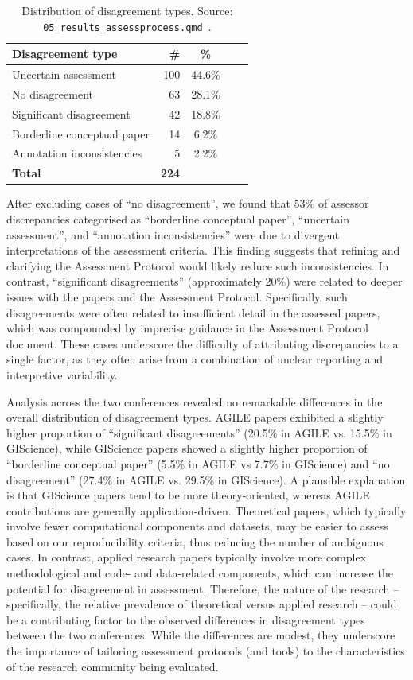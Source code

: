 \documentclass{josis}
\begin{document}
\begin{table}
\centering
\begin{tabular}{lrcrr}
\hline
Disagreement type & \# & \% \\
\hline
Uncertain assessment & 100 & 44.6\% \\
No disagreement & 63 & 28.1\% \\ 
Significant disagreement & 42 &  18.8\% \\ 
Borderline conceptual paper & 14 & 6.2\% \\ 
Annotation inconsistencies & 5 & 2.2\% \\ 
\textbf{Total} &  \textbf{224} & \\
\hline

\end{tabular}
\caption{Distribution of disagreement types. Source: \texttt{05\_results\_assessprocess.qmd}~\cite{data}.}
\label{tab:all_discrepances}
\end{table}

After excluding cases of ``no disagreement'', we found that 53\% of assessor discrepancies categorised as ``borderline conceptual paper'', ``uncertain assessment'', and ``annotation inconsistencies'' were due to divergent interpretations of the assessment criteria. 
This finding suggests that refining and clarifying the Assessment Protocol would likely reduce such inconsistencies. 
In contrast, ``significant disagreements'' (approximately 20\%) were related to deeper issues with the papers and the Assessment Protocol. 
Specifically, such disagreements were often related to insufficient detail in the assessed papers, which was compounded by imprecise guidance in the Assessment Protocol document. 
These cases underscore the difficulty of attributing discrepancies to a single factor, as they often arise from a combination of unclear reporting and interpretive variability.

Analysis across the two conferences revealed no remarkable differences in the overall distribution of disagreement types. 
AGILE papers exhibited a slightly higher proportion of ``significant disagreements'' (20.5\% in AGILE vs. 15.5\% in GIScience), while GIScience papers showed a slightly higher proportion of ``borderline conceptual paper'' (5.5\% in AGILE vs 7.7\% in GIScience) and ``no disagreement'' (27.4\% in AGILE vs. 29.5\% in GIScience). 
A plausible explanation is that GIScience papers tend to be more theory-oriented, whereas AGILE contributions are generally application-driven. 
Theoretical papers, which typically involve fewer computational components and datasets, may be easier to assess based on our reproducibility criteria, thus reducing the number of ambiguous cases. 
In contrast, applied research papers typically involve more complex methodological and code- and data-related components, which can increase the potential for disagreement in assessment. 
Therefore, the nature of the research -- specifically, the relative prevalence of theoretical versus applied research -- could be a contributing factor to the observed differences in disagreement types between the two conferences. 
While the differences are modest, they underscore the importance of tailoring assessment protocols (and tools) to the characteristics of the research community being evaluated.
\end{document}
